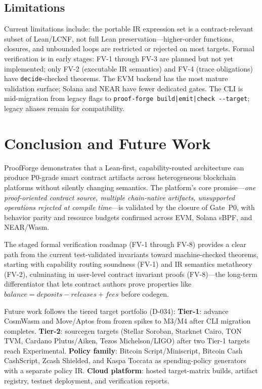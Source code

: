 \documentclass[sigconf]{acmart}
\begin{document}
\subsection{Limitations}

Current limitations include: the portable IR expression set is a contract-relevant subset of
Lean/LCNF, not full Lean preservation---higher-order functions, closures, and unbounded loops
are restricted or rejected on most targets. Formal verification is in early stages: FV-1 through
FV-3 are planned but not yet implemented; only FV-2 (executable IR semantics) and FV-4 (trace
obligations) have \texttt{decide}-checked theorems. The EVM backend has the most mature validation
surface; Solana and NEAR have fewer dedicated gates. The CLI is mid-migration from legacy flags
to \texttt{proof-forge build|emit|check -{}-target}; legacy aliases remain for compatibility.

\section{Conclusion and Future Work}
\label{sec:concl}

ProofForge demonstrates that a Lean-first, capability-routed architecture can produce P0-grade
smart contract artifacts across heterogeneous blockchain platforms without silently changing
semantics. The platform's core promise---\emph{one proof-oriented contract source, multiple
chain-native artifacts, unsupported operations rejected at compile time}---is validated by
the closure of Gate~P0, with behavior parity and resource budgets confirmed across EVM,
Solana sBPF, and NEAR/Wasm.

The staged formal verification roadmap (FV-1 through FV-8) provides a clear path from the current
test-validated invariants toward machine-checked theorems, starting with capability routing
soundness (FV-1) and IR semantics metatheory (FV-2), culminating in user-level contract invariant
proofs (FV-8)---the long-term differentiator that lets contract authors prove properties like
$\textit{balance} = \textit{deposits} - \textit{releases} + \textit{fees}$ before codegen.

Future work follows the tiered target portfolio (D-034): \textbf{Tier-1}: advance CosmWasm
and Move/Aptos from frozen spikes to M3/M4 after CLI migration completes.
\textbf{Tier-2}: sourcegen targets (Stellar Soroban, Starknet Cairo, TON TVM, Cardano
Plutus/Aiken, Tezos Michelson/LIGO) after two Tier-1 targets reach Experimental.
\textbf{Policy family}: Bitcoin Script/Miniscript, Bitcoin Cash CashScript, Zcash Shielded,
and Kaspa Toccata as spending-policy generators with a separate policy IR.
\textbf{Cloud platform}: hosted target-matrix builds, artifact registry, testnet deployment,
and verification reports.
\end{document}
